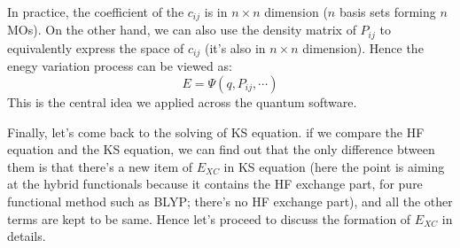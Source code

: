 In practice, the coefficient of the $c_{ij}$ is in $n\times n$
dimension ($n$ basis sets forming $n$ MOs). On the other hand, we can
also use the density matrix of $P_{ij}$ to equivalently express the
space of $c_{ij}$ (it's also in $n\times n$ dimension). Hence the
enegy variation process can be viewed as:
\begin{equation}
 \label{basis_idea_funtional_eq:2}
E = \Psi (q, P_{ij}, \cdots)
\end{equation}  
This is the central idea we applied across the quantum software.

Finally, let's come back to the solving of KS equation. if we
compare the HF equation and the KS equation, we can
find out that the only difference btween them is that there's a new
item of $E_{XC}$ in KS equation (here the point is aiming at the
hybrid functionals because it contains the HF exchange part, for
pure functional method such as BLYP; there's no HF exchange part),
and all the other terms are kept to be same. Hence let's proceed to
discuss the formation of $E_{XC}$ in details.



